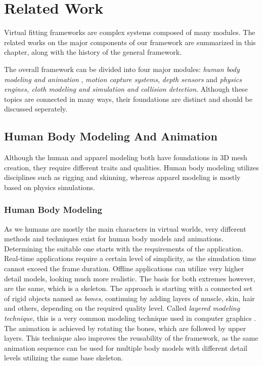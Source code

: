 \chapter{Related Work}
\label{chapter_related_work}

Virtual fitting frameworks are complex systems composed of many modules. The related works on the major components of our framework are summarized in this chapter, 
along with the history of the general framework. 

The overall framework can be divided into four major modules: \textit{human body modeling and animation} , \textit{motion capture systems}, \textit{depth sensors} and 
\textit{physics engines, cloth modeling and simulation and collision detection}. Although these topics are connected in many ways, their foundations are distinct 
and should be discussed seperately.

\section{Human Body Modeling And Animation}
\label{section_related_modeling}

Although the human and apparel modeling both have foundations in 3D mesh creation, they require different traits and qualities. Human body modeling utilizes disciplines such as rigging and 
skinning, whereas apparel modeling is mostly based on physics simulations.

\subsection{Human Body Modeling}
As we humans are mostly the main characters in virtual worlds, very different methods and techniques exist for human body models and animations. Determining the suitable one 
starts with the requirements of the application. Real-time applications require a certain level of simplicity, as the simulation time cannot exceed the frame duration. Offline 
applications can utilize very higher detail models, looking much more realistic. The basis for both extremes however, are the same, which is a skeleton. The approach is starting 
with a connected set of rigid objects named as \textit{bones}, continuing by adding layers of muscle, skin, hair and others, depending on the required quality level. Called \textit{layered
modeling technique}, this is a very common modeling technique used in computer graphics \cite{Chadwick1989}. The animation is achieved by rotating the bones, which are followed by 
upper layers. This technique also improves the reusability of the framework, as the same animation sequence can be used for multiple body models with different detail levels utilizing the 
same base skeleton.   

